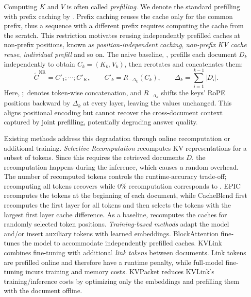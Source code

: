Computing $K$ and $V$ is often called \emph{prefilling}.
We denote the standard prefilling with prefix caching by \fullrec.
Prefix caching reuses the cache only for the common prefix, thus
a sequence with a different prefix requires computing the cache from the scratch.
This restriction motivates reusing independently prefilled caches at non-prefix positions,
known as \emph{position-independent caching}, \emph{non-prefix KV cache reuse}, \emph{individual prefill} and so on.
%
The naive baseline, \norec, prefills each document $D_k$ independently to obtain $C_k=(K_k,V_k)$,
then rerotates and concatenates them:
\[
\tilde{C}^{\mathrm{NR}} = C'_1;\cdots;C'_K,
\qquad
C'_k = R_{-\Delta_k}(C_k),
\qquad
\Delta_k = \sum_{i=1}^{k-1}|D_i|.
\]
Here, $;$ denotes token-wise concatenation, and $R_{-\Delta_k}$ shifts the keys' RoPE positions backward by $\Delta_k$ at every layer, leaving the values unchanged.
This aligns positional encoding but cannot recover the cross-document context captured by joint prefilling, potentially degrading answer quality.

Existing methods address this degradation through online recomputation or additional training.
\emph{Selective Recomputation} recomputes KV representations for a subset of tokens.
Since this requires the retrieved documents $D$,
the recomputation happens during the inference, which causes a random overhead.
The number of recomputed tokens controls the runtime-accuracy trade-off;
recomputing all tokens recovers \fullrec while 0\% recomputation corresponds to \norec.
EPIC \citep{hu2024epic} recomputes the tokens at the beginning of each document,
while CacheBlend \citep{yao2025cacheblend}
first recomputes the first layer for all tokens and then selects the tokens with the largest first layer cache difference.
As a baseline, \randrec recomputes the caches for randomly selected token positions.
\emph{Training-based methods} adapt the model and/or insert auxiliary tokens with learned embeddings.
BlockAttention \citep{ma2025block} fine-tunes the model to accommodate independently prefilled caches.
KVLink \citep{yang2026kvlink} combines fine-tuning with additional \emph{link tokens} between documents.
Link tokens are prefilled online and therefore have a runtime penalty,
while full-model fine-tuning incurs training and memory costs.
KVPacket \citep{chen2026kvpacket} reduces KVLink's training/inference costs
by optimizing only the embeddings and
prefilling them with the document offline.

